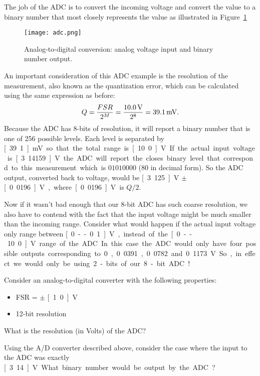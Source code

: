 The job of the ADC is to convert the incoming voltage and convert the value to a binary number that most closely represents the value as illustrated in Figure~\ref{f:adc}
\begin{figure}[hbt!]
\centering
\texttt{[image: adc.png]}
\caption{Analog-to-digital conversion: analog voltage input and binary number output.}
\label{f:adc}
\end{figure}
An important consideration of this ADC example is the resolution of the measurement, also known as the quantization error, which can be calculated using the same expression as before:
\begin{equation}
Q = \frac{FSR}{2^M} = \frac{\unit[10.0]{V}}{2^8} = \unit[39.1]{mV}.
\end{equation}
Because the ADC has 8-bits of resolution, it will report a binary number that is one of 256 possible levels.  Each level is separated by \unit[39.1]{mV} so that the total range is \unit[10.0]{V}.  If the actual input voltage is \unit[3.14159]{V} the ADC will report the closes binary level that correspond to this measurement which is $01010000$ (80 in decimal form).  So the ADC output, converted back to voltage, would be \unit[3.125]{V} $\pm$ \unit[0.0196]{V}, where \unit[0.0196]{V} is $Q/2$.  

Now if it wasn't bad enough that our 8-bit ADC has such coarse resolution, we also have to contend with the fact that the input voltage might be much smaller than the incoming range.  Consider what would happen if the actual input voltage only range between \unit[0--0.1]{V}, instead of the \unit[0--10.0]{V} range of the ADC.  In this case the ADC would only have four possible outputs corresponding to 0, 0.0391, 0.0782 and 0.1173 V.  So, in effect we would only be using 2-bits of our 8-bit ADC!

\begin{ex}
Consider an analog-to-digital converter with the following properties:
\begin{itemize}
\item FSR = $\pm$ \unit[1.0]{V}
\item 12-bit resolution
\end{itemize}
What is the resolution (in Volts) of the ADC?  
\end{ex}
\begin{ex}
Using the A/D converter described above, consider the case where the input to the ADC was exactly \unit[3.14]{V}. What binary number would be output by the ADC?
\end{ex}

